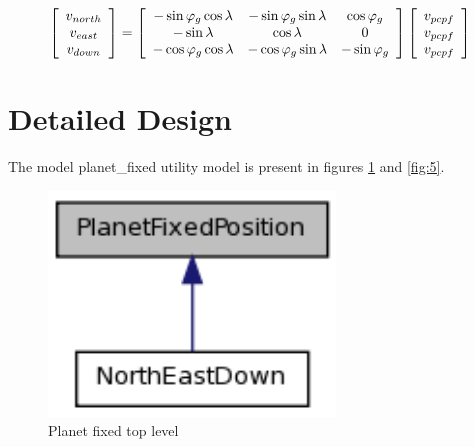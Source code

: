 \documentclass[twoside,11pt,titlepage]{report}
\begin{document}
\begin{equation}
\left[ {\begin{array}{*{20}c}
   {v_{north} }  \\
   {v_{east} }  \\
   {v_{down} }  \\
\end{array}} \right] = \left[ {\begin{array}{*{20}c}
   { - \sin \varphi _g \cos \lambda } & { - \sin \varphi _g \sin \lambda } & {\cos \varphi _g }  \\
   { - \sin \lambda } & {\cos \lambda } & 0  \\
   { - \cos \varphi _g \cos \lambda } & { - \cos \varphi _g \sin \lambda } & { - \sin \varphi _g }  \\
\end{array}} \right]\left[ {\begin{array}{*{20}c}
   {v_{pcpf} }  \\
   {v_{pcpf} }  \\
   {v_{pcpf} }  \\
\end{array}} \right]
\end{equation}


\section{Detailed Design}
The model planet\_fixed utility model is present in figures \ref{fig:4} and \ref{fig:5}.
\begin{figure}[htp]
\centering
\includegraphics [width=3in]{figs/pfix_inherit.png}
\caption{Planet fixed top level}
\label{fig:4}
\end{figure}
\end{document}
